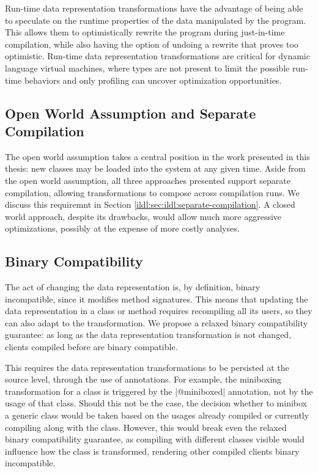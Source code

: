 Run-time data representation transformations have the advantage of being able to speculate on the runtime properties of the data manipulated by the program. This allows them to optimistically rewrite the program during just-in-time compilation, while also having the option of undoing a rewrite that proves too optimistic. Run-time data representation transformations are critical for dynamic language virtual machines, where types are not present to limit the possible run-time behaviors and only profiling can uncover optimization opportunities.

\subsection{Open World Assumption and Separate Compilation}

The open world assumption takes a central position in the work presented in this thesis: new classes may be loaded into the system at any given time. Aside from the open world assumption, all three approaches presented support separate compilation, allowing transformations to compose across compilation runs. We discuss this requiremnt in Section \ref{ildl:sec:ildl:separate-compilation}. A closed world approach, despite its drawbacks, would allow much more aggressive optimizations, possibly at the expense of more costly analyses.

\subsection{Binary Compatibility}

The act of changing the data representation is, by definition, binary incompatible, since it modifies method signatures. This means that updating the data representation in a class or method requires recompiling all its users, so they can also adapt to the transformation. We propose a relaxed binary compatibility guarantee: as long as the data representation transformation is not changed, clients compiled before are binary compatible.

This requires the data representation transformations to be persisted at the source level, through the use of annotations. For example, the miniboxing transformation for a class is triggered by the |@miniboxed| annotation, not by the usage of that class. Should this not be the case, the decision whether to minibox a generic class would be taken based on the usages already compiled or currently compiling along with the class. However, this would break even the relaxed binary compatibility guarantee, as compiling with different classes visible would influence how the class is transformed, rendering other compiled clients binary incompatible.

